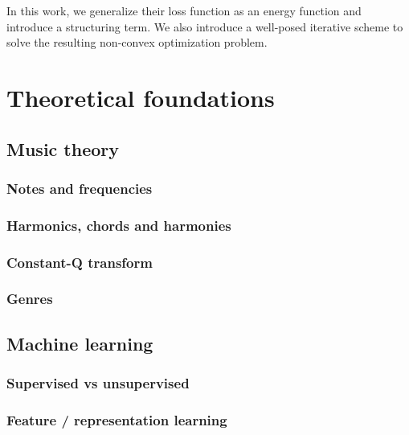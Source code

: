 \documentclass[a4paper,12pt,twoside]{report}
\begin{document}
In this work, we generalize their loss function as an energy function and introduce a structuring term. We also introduce a well-posed iterative scheme to solve the resulting non-convex optimization problem.

\part{Theoretical foundations}

\chapter{Music theory}

\section{Notes and frequencies}

\section{Harmonics, chords and harmonies}

\section{Constant-Q transform}

\section{Genres}

\chapter{Machine learning}

\section{Supervised vs unsupervised}

\section{Feature / representation learning}
\end{document}
